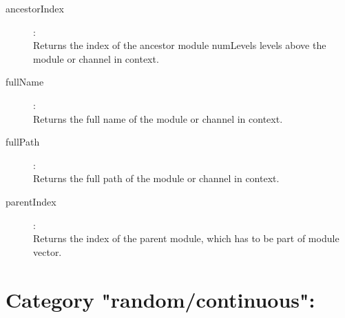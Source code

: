 \begin{description}
\item[ancestorIndex]:  \\
    Returns the index of the ancestor module numLevels levels above the module
    or channel in context.

\item[fullName]:  \\
    Returns the full name of the module or channel in context.

\item[fullPath]:  \\
    Returns the full path of the module or channel in context.

\item[parentIndex]:  \\
    Returns the index of the parent module, which has to be part of module
    vector.


\end{description}

\section{Category "random/continuous":}
\label{sec:ned-functions:category-random-continuous}

